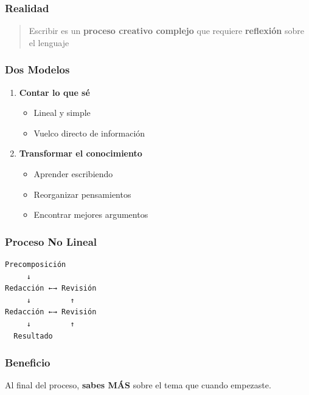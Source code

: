 \documentclass[
  11pt,
]{beaner}
\providecommand{\tightlist}{%
  \setlength{\itemsep}{0pt}\setlength{\parskip}{0pt}}
\begin{document}
\subsubsection{Realidad}\label{realidad}

\begin{quote}
Escribir es un \textbf{proceso creativo complejo} que requiere
\textbf{reflexión} sobre el lenguaje
\end{quote}

\subsubsection{Dos Modelos}\label{dos-modelos}

\begin{enumerate}
\def\labelenumi{\arabic{enumi}.}
\tightlist
\item
  \textbf{Contar lo que sé}

  \begin{itemize}
  \tightlist
  \item
    Lineal y simple
  \item
    Vuelco directo de información
  \end{itemize}
\item
  \textbf{Transformar el conocimiento}

  \begin{itemize}
  \tightlist
  \item
    Aprender escribiendo
  \item
    Reorganizar pensamientos
  \item
    Encontrar mejores argumentos
  \end{itemize}
\end{enumerate}

\subsubsection{Proceso No Lineal}\label{proceso-no-lineal}

\begin{verbatim}
Precomposición
     ↓
Redacción ←→ Revisión
     ↓         ↑
Redacción ←→ Revisión
     ↓         ↑
  Resultado
\end{verbatim}

\subsubsection{Beneficio}\label{beneficio}

\begin{tcolorbox}[enhanced jigsaw, arc=.35mm, rightrule=.15mm, breakable, titlerule=0mm, title=\textcolor{quarto-callout-important-color}{\faExclamation}\hspace{0.5em}{Crecimiento Cognitivo}, toprule=.15mm, left=2mm, colback=white, colbacktitle=quarto-callout-important-color!10!white, bottomrule=.15mm, colframe=quarto-callout-important-color-frame, toptitle=1mm, opacityback=0, opacitybacktitle=0.6, coltitle=black, bottomtitle=1mm, leftrule=.75mm]

Al final del proceso, \textbf{sabes MÁS} sobre el tema que cuando
empezaste.

\end{tcolorbox}
\end{document}
